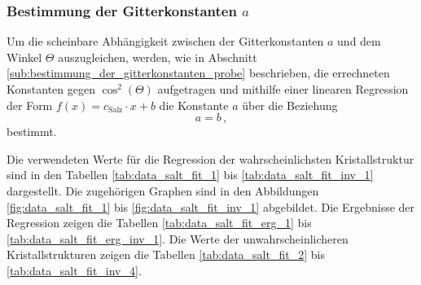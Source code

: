 \clearpage
\subsubsection{Bestimmung der Gitterkonstanten $a$} %
\label{sub:bestimmung_der_gitterkonstanten_salt}

Um die scheinbare Abhängigkeit zwischen der Gitterkonstanten $a$ und dem Winkel $\Theta$ auszugleichen, werden,
wie in Abschnitt \ref{sub:bestimmung_der_gitterkonstanten_probe} beschrieben,
die errechneten Konstanten gegen $\cos^2{(\Theta)}$ aufgetragen und mithilfe einer linearen Regression der Form
$f(x) = c_\text{Salz} \cdot x + b$ die Konstante $a$ über die Beziehung
\begin{equation*}
    a = b\,,
\end{equation*}
bestimmt.

Die verwendeten Werte für die Regression der wahrscheinlichsten Kristallstruktur sind in den Tabellen \ref{tab:data_salt_fit_1} bis \ref{tab:data_salt_fit_inv_1} dargestellt.
Die zugehörigen Graphen sind in den Abbildungen \ref{fig:data_salt_fit_1} bis \ref{fig:data_salt_fit_inv_1} abgebildet.
Die Ergebnisse der Regression zeigen die Tabellen \ref{tab:data_salt_fit_erg_1} bis \ref{tab:data_salt_fit_erg_inv_1}.
Die Werte der unwahrscheinlicheren Kristallstrukturen zeigen die Tabellen \ref{tab:data_salt_fit_2} bis \ref{tab:data_salt_fit_inv_4}.

